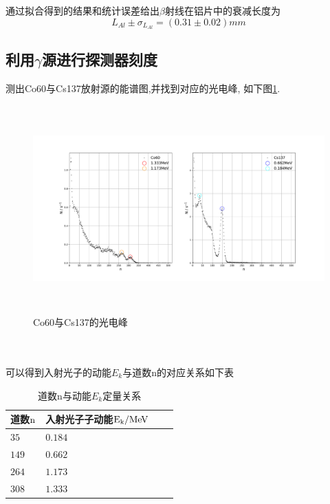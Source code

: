 \documentclass[a4paper]{article}
\begin{document}
通过拟合得到的结果和统计误差给出$\beta$射线在铝片中的衰减长度为
\begin{equation}
    L_{Al}\pm\sigma_{L_{Al}}=(0.31\pm0.02)mm
\end{equation}

\newpage
\subsection{利用$\gamma$源进行探测器刻度}\label{sub:ctl}
测出Co60与Cs137放射源的能谱图,并找到对应的光电峰, 如下图\ref{fig:fig4}. 
\begin{figure}[ht]
 \centering
 \includegraphics[height=8cm, width=16cm]{images/phyex3_fig1.pdf}
 \caption{Co60与Cs137的光电峰}
 \label{fig:fig4}
\end{figure}\\\\
可以得到入射光子的动能$E_k$与道数n的对应关系如下表
\begin{table}[htp]
\caption{道数n与动能$E_k$定量关系}\label{tab:signaldef}
\begin{center}\begin{tabular}{|l|l|l|p{6cm}|}
	\hline
	\textbf{道数$\rm n$} & \textbf{入射光子子动能$\rm E_k/MeV$}\\ \hline \hline
	$35$    & $0.184$ 	\\ \hline
	$149$    & $0.662$    \\ \hline
	$264$    & $1.173$    \\ \hline
	$308$    & $1.333$    \\ \hline
	\hline
	\end{tabular}
\end{center}
\end{table}\\
\end{document}
